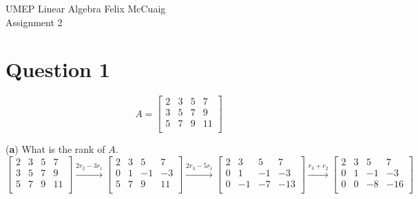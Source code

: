 \documentclass[12pt]{article}
\begin{document}
UMEP Linear Algebra \hfill Felix McCuaig \\
Assignment 2

\section*{Question 1}

$$
A=
\begin{bmatrix}
   2 & 3 & 5 & 7\\
   3 & 5 & 7 & 9\\
   5 & 7 & 9 & 11\\
\end{bmatrix}
$$

(\textbf{a}) What is the rank of $A$.\\

$$
\begin{bmatrix}
   2 & 3 & 5 & 7\\
   3 & 5 & 7 & 9\\
   5 & 7 & 9 & 11\\
\end{bmatrix} \overset{2r_2-3r_1}{\longrightarrow} 
\begin{bmatrix}
   2 & 3 & 5 & 7\\
   0 & 1 & -1 & -3\\
   5 & 7 & 9 & 11\\
\end{bmatrix} \overset{2r_3-5r_1}{\longrightarrow} 
\begin{bmatrix}
    2 & 3 & 5 & 7\\
   0 & 1 & -1 & -3\\
   0 & -1 & -7 & -13\\
\end{bmatrix} \overset{r_3+r_2}{\longrightarrow} 
\begin{bmatrix}
    2 & 3 & 5 & 7\\
   0 & 1 & -1 & -3\\
   0 & 0 & -8 & -16\\
\end{bmatrix}
$$
\end{document}
